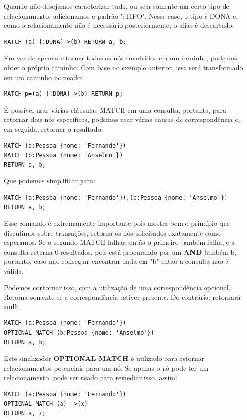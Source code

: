 Quando não desejamos caracterizar tudo, ou seja somente um certo tipo de relacionamento, adicionamos o padrão ":TIPO". Nesse caso, o tipo é DONA e, como o relacionamento não é necessário posteriormente, o alias é descartado:
\begin{lstlisting}[]
MATCH (a)-[:DONA]->(b) RETURN a, b;
\end{lstlisting}

Em vez de apenas retornar todos os nós envolvidos em um caminho, podemos obter o próprio caminho. Com base no exemplo anterior, isso será transformado em um caminho nomeado:
\begin{lstlisting}[]
MATCH p=(a)-[:DONA]->(b) RETURN p;	
\end{lstlisting}

É possível usar várias cláusulas MATCH em uma consulta, portanto, para retornar dois nós específicos, podemos usar várias causas de correspondência e, em seguida, retornar o resultado: 
\begin{lstlisting}[]
MATCH (a:Pessoa {nome: 'Fernando'})
MATCH (b:Pessoa {nome: 'Anselmo'})
RETURN a, b;
\end{lstlisting}

Que podemos simplificar para:
\begin{lstlisting}[]
MATCH (a:Pessoa {nome: 'Fernando'}),(b:Pessoa {nome: 'Anselmo'}) RETURN a, b;
\end{lstlisting}

Esse comando é extremamente importante pois mostra bem o princípio que discutimos sobre transações, retorna os nós solicitados exatamente como esperamos. Se o segundo MATCH falhar, então o primeiro também falha, e a consulta retorna 0 resultados, pois está procurando por um \textbf{AND} também b, portanto, caso não conseguir encontrar nada em "b" então a consulta não é válida. 

Podemos contornar isso, com a utilização de uma correspondência opcional. Retorna somente se a correspondência estiver presente. Do contrário, retornará \textbf{null}: 
\begin{lstlisting}[]
MATCH (a:Pessoa {nome: 'Fernando'})
OPTIONAL MATCH (b:Pessoa {nome: 'Anselmo'})
RETURN a, b;
\end{lstlisting}

Este sinalizador \textbf{OPTIONAL MATCH} é utilizado para retornar relacionamentos potenciais para um nó. Se apenas o nó pode ter um relacionamento, pode ser usado para remediar isso, assim: 
\begin{lstlisting}[]
MATCH (a:Pessoa {nome: 'Fernando'})
OPTIONAL MATCH (a)-->(x)
RETURN a, x;	
\end{lstlisting}

